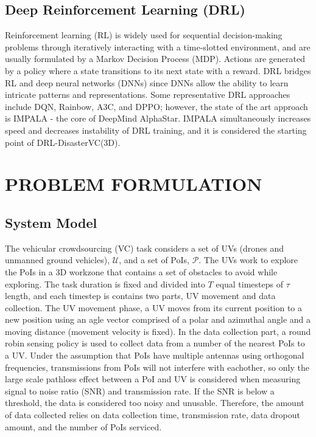 \documentclass[sigconf, natbib=false]{acmart}
\newcommand{\UV}{\mathcal{U}}
\newcommand{\PoI}{\mathcal{P}}
\begin{document}
   \subsection{Deep Reinforcement Learning (DRL)}
   Reinforcement learning (RL) is widely used for sequential decision-making problems through iteratively interacting with a time-slotted environment, and are usually formulated by a Markov Decision Process (MDP). Actions are generated by a policy where a state transitions to its next state with a reward. DRL bridges RL and deep neural networks (DNNs) since DNNs allow the ability to learn intricate patterns and representations. Some representative DRL approaches include DQN, Rainbow, A3C, and DPPO; however, the state of the art approach is IMPALA - the core of DeepMind AlphaStar. IMPALA simultaneously increases speed and decreases instability of DRL training, and it is considered the starting point of DRL-DisasterVC(3D).

   \section{PROBLEM FORMULATION}
   \subsection{System Model}
   The vehicular crowdsourcing (VC) task considers a set of UVs (drones and unmanned ground vehicles), $\UV$, and a set of PoIs, $\PoI$. The UVs work to explore the PoIs in a 3D workzone that contains a set of obstacles to avoid while exploring. The task duration is fixed and divided into $T$ equal timesteps of $\tau$ length, and each timestep is contains two parts, UV movement and data collection. The UV movement phase, a UV moves from its current position to a new position using an agle vector comprised of a polar and azimuthal angle and a moving distance (movement velocity is fixed). In the data collection part, a round robin sensing policy is used to collect data from a number of the nearest PoIs to a UV. Under the assumption that PoIs have multiple antennas using orthogonal frequencies, transmissions from PoIs will not interfere with eachother, so only the large scale pathloss effect between a PoI and UV is considered when measuring signal to noise ratio (SNR) and transmission rate. If the SNR is below a threshold, the data is considered too noisy and unusable. Therefore, the amount of data collected relies on data collection time, transmission rate, data dropout amount, and the number of PoIs serviced.
\end{document}
